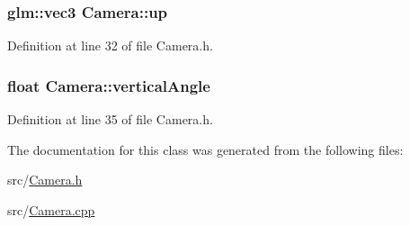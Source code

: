 \subsubsection[{up}]{\setlength{\rightskip}{0pt plus 5cm}glm\+::vec3 Camera\+::up\hspace{0.3cm}{\ttfamily [private]}}\label{class_camera_a3fe5f351380fb118ffc600591769f049}


Definition at line 32 of file Camera.\+h.

\hypertarget{class_camera_a6582a5068d81b8de7a7fc67e5143e628}{}
\subsubsection[{vertical\+Angle}]{\setlength{\rightskip}{0pt plus 5cm}float Camera\+::vertical\+Angle\hspace{0.3cm}{\ttfamily [private]}}\label{class_camera_a6582a5068d81b8de7a7fc67e5143e628}


Definition at line 35 of file Camera.\+h.



The documentation for this class was generated from the following files\+:\begin{DoxyCompactItemize}
\item 
src/\hyperlink{_camera_8h}{Camera.\+h}\item 
src/\hyperlink{_camera_8cpp}{Camera.\+cpp}\end{DoxyCompactItemize}
